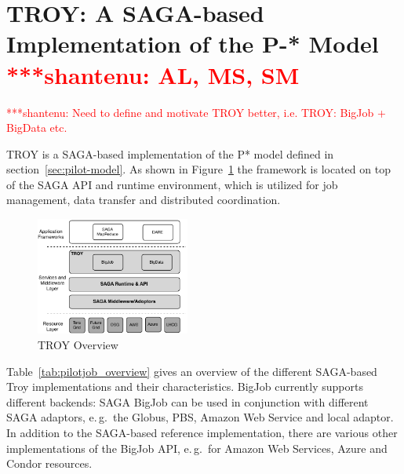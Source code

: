 \documentclass[conference,final]{IEEEtran}
\newcommand{\jhanote}[1]{ {\textcolor{red} { ***shantenu: #1 }}}
\newcommand{\jhanote}[1]{}
\begin{document}
\section{TROY: A SAGA-based Implementation of the P-* Model
  \jhanote{AL, MS, SM}}


\jhanote{Need to define and motivate TROY better, i.e. TROY: BigJob +
  BigData etc.}

TROY is a SAGA-based implementation of the P* model defined in 
section~\ref{sec:pilot-model}. As shown in Figure~\ref{fig:figures_troy} the 
framework is located on top of the SAGA API and runtime environment, which is 
utilized for job management, data transfer and distributed coordination.

\begin{figure}[htbp]
	\centering
		\includegraphics[width=0.45\textwidth]{figures/troy.pdf}
	\caption{TROY Overview}
	\label{fig:figures_troy}
\end{figure}


Table~\ref{tab:pilotjob_overview} gives an overview of the different SAGA-based 
Troy implementations and their characteristics. BigJob currently
supports different backends: SAGA BigJob can be used in conjunction
with different SAGA adaptors, e.\,g.\ the Globus, PBS, Amazon Web
Service and local adaptor. In addition to the SAGA-based reference
implementation, there are various other implementations of the BigJob
API, e.\,g.\ for Amazon Web Services, Azure and Condor resources.
\end{document}
